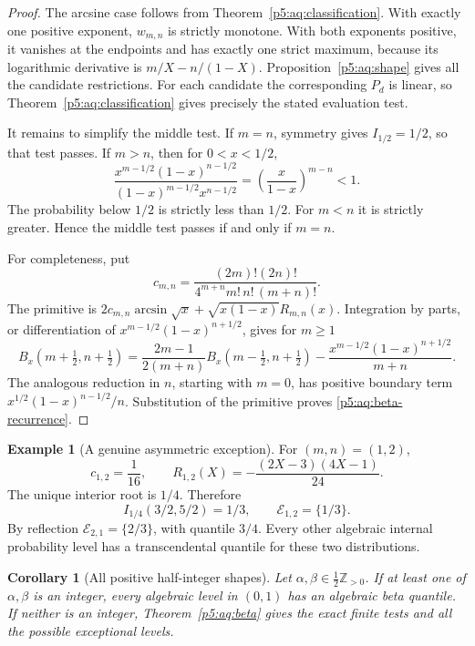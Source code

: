 \documentclass[11pt,a4paper]{article}
\newtheorem{corollary}[theorem]{Corollary}
\theoremstyle{definition}
\newtheorem{example}[theorem]{Example}
\theoremstyle{remark}
\numberwithin{equation}{section}
\begin{document}
\begin{proof}
The arcsine case follows from
Theorem~\ref{p5:aq:classification}.
With exactly one positive exponent, $w_{m,n}$ is strictly
monotone. With both exponents positive, it vanishes at the
endpoints and has exactly one strict maximum, because its
logarithmic derivative is $m/X-n/(1-X)$.
Proposition~\ref{p5:aq:shape} gives all the candidate restrictions.
For each candidate the corresponding $P_d$ is linear, so
Theorem~\ref{p5:aq:classification} gives precisely the stated
evaluation test.

It remains to simplify the middle test. If $m=n$, symmetry
gives $I_{1/2}=1/2$, so that test passes. If $m>n$, then for
$0<x<1/2$,
\[
 \frac{x^{m-1/2}(1-x)^{n-1/2}}
      {(1-x)^{m-1/2}x^{n-1/2}}
       =\left(\frac{x}{1-x}\right)^{m-n}<1.
\]
The probability below $1/2$ is strictly less than $1/2$.
For $m<n$ it is strictly greater. Hence the middle test
passes if and only if $m=n$.

For completeness, put
\[
 c_{m,n}=\frac{(2m)!(2n)!}
                  {4^{m+n}m!\,n!\,(m+n)!}.
\]
The primitive is
$2c_{m,n}\arcsin\sqrt{x}+\sqrt{x(1-x)}R_{m,n}(x)$.
Integration by parts, or differentiation of
$x^{m-1/2}(1-x)^{n+1/2}$, gives for $m\ge1$
\[
 B_x(m+\tfrac12,n+\tfrac12)
 =\frac{2m-1}{2(m+n)}
           B_x(m-\tfrac12,n+\tfrac12)
   -\frac{x^{m-1/2}(1-x)^{n+1/2}}{m+n}.
\]
The analogous reduction in $n$, starting with $m=0$,
has positive boundary term
$x^{1/2}(1-x)^{n-1/2}/n$.
Substitution of the primitive proves
\eqref{p5:aq:beta-recurrence}.
\end{proof}

\begin{example}[A genuine asymmetric exception]
For $(m,n)=(1,2)$,
\[
 c_{1,2}=\frac1{16},\qquad
 R_{1,2}(X)=-\frac{(2X-3)(4X-1)}{24}.
\]
The unique interior root is $1/4$. Therefore
\[
 I_{1/4}(3/2,5/2)=1/3,\qquad
 \mathcal E_{1,2}=\{1/3\}.
\]
By reflection
$\mathcal E_{2,1}=\{2/3\}$, with quantile $3/4$.
Every other algebraic internal probability level has a
transcendental quantile for these two distributions.
\end{example}

\begin{corollary}[All positive half-integer shapes]\label{p5:aq:lattice}
Let $\alpha,\beta\in\frac12\mathbb Z_{>0}$.
If at least one of $\alpha,\beta$ is an integer, every
algebraic level in $(0,1)$ has an algebraic beta quantile.
If neither is an integer, Theorem~\ref{p5:aq:beta} gives
the exact finite tests and all the possible exceptional levels.
\end{corollary}
\end{document}
